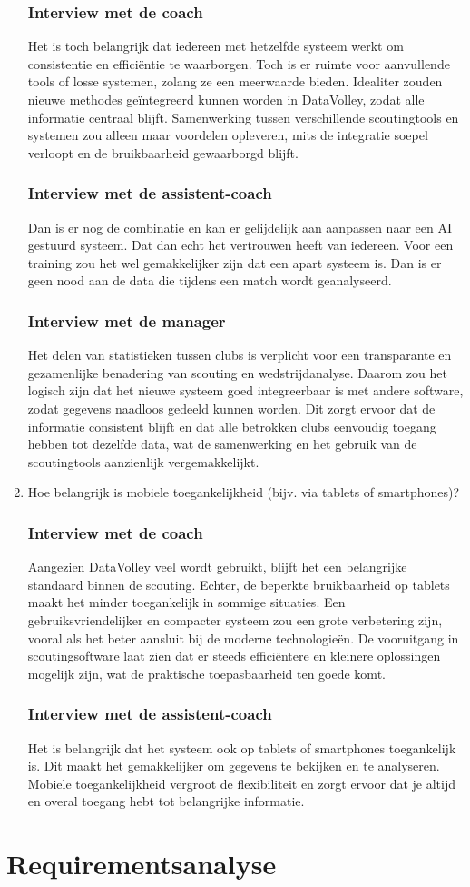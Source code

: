 \begin{enumerate}
  \subsubsection{Interview met de coach}
  Het is toch belangrijk dat iedereen met hetzelfde systeem werkt om consistentie en efficiëntie te waarborgen. Toch is er ruimte voor aanvullende tools of losse systemen, zolang ze een meerwaarde bieden. Idealiter zouden nieuwe methodes geïntegreerd kunnen worden in DataVolley, zodat alle informatie centraal blijft. Samenwerking tussen verschillende scoutingtools en systemen zou alleen maar voordelen opleveren, mits de integratie soepel verloopt en de bruikbaarheid gewaarborgd blijft.
  \subsubsection{Interview met de assistent-coach}
  Dan is er nog de combinatie en kan er gelijdelijk aan aanpassen naar een AI gestuurd systeem. Dat dan echt het vertrouwen heeft van iedereen. Voor een training zou het wel gemakkelijker zijn dat een apart systeem is. Dan is er geen nood aan de data die tijdens een match wordt geanalyseerd.
  \subsubsection{Interview met de manager}
  Het delen van statistieken tussen clubs is verplicht voor een transparante en gezamenlijke benadering van scouting en wedstrijdanalyse. Daarom zou het logisch zijn dat het nieuwe systeem goed integreerbaar is met andere software, zodat gegevens naadloos gedeeld kunnen worden. Dit zorgt ervoor dat de informatie consistent blijft en dat alle betrokken clubs eenvoudig toegang hebben tot dezelfde data, wat de samenwerking en het gebruik van de scoutingtools aanzienlijk vergemakkelijkt.
  \item Hoe belangrijk is mobiele toegankelijkheid (bijv. via tablets of smartphones)?
  \subsubsection{Interview met de coach}
  Aangezien DataVolley veel wordt gebruikt, blijft het een belangrijke standaard binnen de scouting. Echter, de beperkte bruikbaarheid op tablets maakt het minder toegankelijk in sommige situaties. Een gebruiksvriendelijker en compacter systeem zou een grote verbetering zijn, vooral als het beter aansluit bij de moderne technologieën. De vooruitgang in scoutingsoftware laat zien dat er steeds efficiëntere en kleinere oplossingen mogelijk zijn, wat de praktische toepasbaarheid ten goede komt.
  \subsubsection{Interview met de assistent-coach}
  Het is belangrijk dat het systeem ook op tablets of smartphones toegankelijk is. Dit maakt het gemakkelijker om gegevens te bekijken en te analyseren. Mobiele toegankelijkheid vergroot de flexibiliteit en zorgt ervoor dat je altijd en overal toegang hebt tot belangrijke informatie.
\end{enumerate}

\section{Requirementsanalyse}